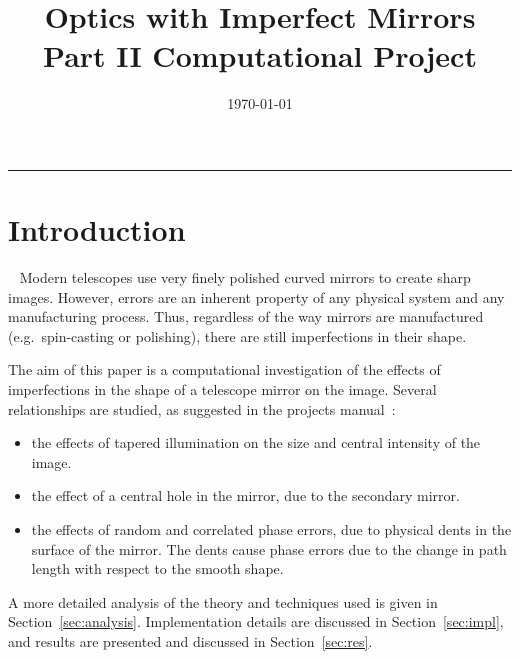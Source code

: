 \documentclass[11pt]{article}
\begin{document}
\title{Optics with Imperfect Mirrors\\Part II Computational Project}
\author{}
\date{\today}
\maketitle


\noindent\rule{0.85\textwidth}{0.4pt}


\section{Introduction}~\label{sec:intro}
Modern telescopes use very finely polished curved mirrors to create sharp images. However, errors are an inherent property of any physical system and any manufacturing process. Thus, regardless of the way mirrors are manufactured (e.g.\ spin-casting or polishing), there are still imperfections in their shape.

The aim of this paper is a computational investigation of the effects of imperfections in the shape of a telescope mirror on the image. Several relationships are studied, as suggested in the projects manual~\cite{manual}:
\begin{itemize}
    \item the effects of tapered illumination on the size and central intensity of the image.
    \item the effect of a central hole in the mirror, due to the secondary mirror.
    \item the effects of random and correlated phase errors, due to physical dents in the surface of the mirror. The dents cause phase errors due to the change in path length with respect to the smooth shape.
\end{itemize}

A more detailed analysis of the theory and techniques used is given in Section~\ref{sec:analysis}. Implementation details are discussed in Section~\ref{sec:impl}, and results are presented and discussed in Section~\ref{sec:res}.
\end{document}
